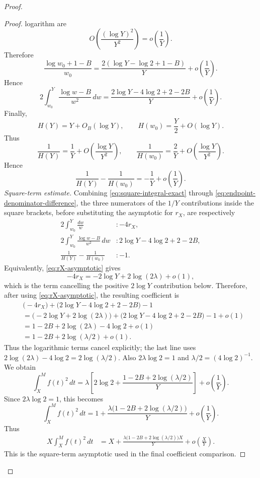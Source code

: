 \documentclass[11pt]{article}
\begin{document}
\begin{proof}
\begin{proof}
logarithm are
\[
O\left(\frac{(\log Y)^2}{Y^2}\right)=o\left(\frac1Y\right).
\]
Therefore
\[
\frac{\log w_0+1-B}{w_0}
=
\frac{2(\log Y-\log 2+1-B)}{Y}
+
o\left(\frac1Y\right).
\]
Hence
\[
2\int_{w_0}^Y\frac{\log w-B}{w^2}\,dw
=
\frac{2\log Y-4\log 2+2-2B}{Y}
+
o\left(\frac1Y\right).
\]
Finally,
\[
H(Y)=Y+O_B(\log Y),
\qquad
H(w_0)=\frac Y2+O(\log Y).
\]
Thus
\[
\frac1{H(Y)}=\frac1Y+O\left(\frac{\log Y}{Y^2}\right),
\qquad
\frac1{H(w_0)}=\frac2Y+O\left(\frac{\log Y}{Y^2}\right).
\]
Hence
\[
\frac1{H(Y)}-
\frac1{H(w_0)}
=
-\frac1Y+
o\left(\frac1Y\right).
\tag{28}\label{eq:endpoint-denominator-difference}
\]
\noindent\textit{Square-term estimate.} Combining \eqref{eq:square-integral-exact} through
\eqref{eq:endpoint-denominator-difference}, the three numerators of the $1/Y$ contributions inside
the square brackets, before substituting
the asymptotic for $r_X$, are respectively
\[
\begin{aligned}
2\int_{w_0}^Y \frac{dw}{w} &: -4r_X,\\
2\int_{w_0}^Y \frac{\log w-B}{w^2}\,dw
&: 2\log Y-4\log 2+2-2B,\\
\frac1{H(Y)}-\frac1{H(w_0)} &: -1.
\end{aligned}
\]
Equivalently, \eqref{eq:rX-asymptotic} gives
\[
-4r_X=-2\log Y+2\log(2\lambda)+o(1),
\]
which is the term cancelling the positive $2\log Y$ contribution below. Therefore, after using
\eqref{eq:rX-asymptotic}, the resulting coefficient is
\[
\begin{aligned}
&\bigl(-4r_X\bigr)
 +\bigl(2\log Y-4\log 2+2-2B\bigr)-1 \\
&=\bigl(-2\log Y+2\log(2\lambda)\bigr)
  +\bigl(2\log Y-4\log 2+2-2B\bigr)-1+o(1) \\
&=1-2B+2\log(2\lambda)-4\log 2+o(1) \\
&=1-2B+2\log(\lambda/2)+o(1).
\end{aligned}
\]
Thus the logarithmic terms cancel explicitly; the last line uses
$2\log(2\lambda)-4\log 2=2\log(\lambda/2)$. Also
$2\lambda\log 2=1$ and $\lambda/2=(4\log 2)^{-1}$. We obtain
\[
\int_X^M f(t)^2\,dt
=
\lambda\left[
2\log 2+
\frac{1-2B+2\log(\lambda/2)}{Y}
\right]
+
o\left(\frac1Y\right).
\]
Since $2\lambda\log 2=1$, this becomes
\[
\int_X^M f(t)^2\,dt
=
1+
\frac{\lambda\bigl(1-2B+2\log(\lambda/2)\bigr)}{Y}
+
o\left(\frac1Y\right).
\]
Thus
\[
\begin{aligned}
X\int_X^M f(t)^2\,dt
&=
X+
\frac{\lambda\bigl(1-2B+2\log(\lambda/2)\bigr)X}{Y}
+
o\left(\frac X Y\right).
\end{aligned}
\tag{29}\label{eq:square-term-asymptotic}
\]
This is the square-term asymptotic used in the final coefficient comparison.


\end{proof}
\end{proof}
\end{document}
